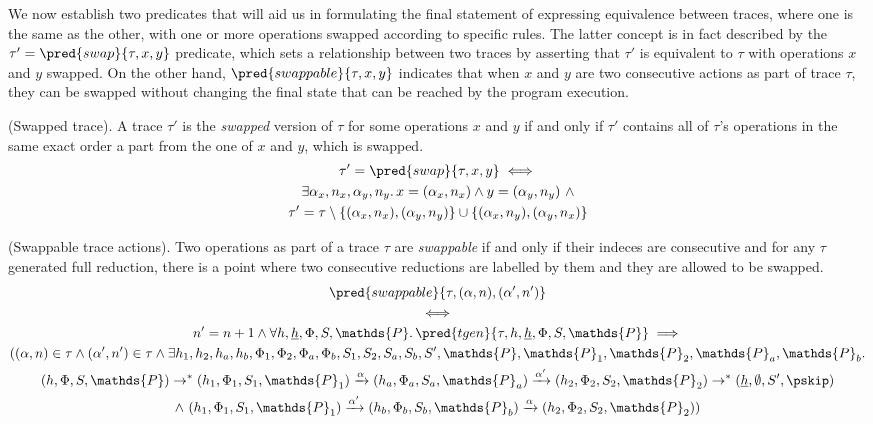 We now establish two predicates that will aid us in formulating the final statement of expressing equivalence between traces, where one is the same as the other, with one or more operations swapped according to specific rules. The latter concept is in fact described by the $\tau' = \pred{swap}{\tau, x, y}$ predicate, which sets a relationship between two traces by asserting that $\tau'$ is equivalent to $\tau$ with operations $x$ and $y$ swapped. On the other hand, $\pred{swappable}{\tau, x, y}$ indicates that when $x$ and $y$ are two consecutive actions as part of trace $\tau$, they can be swapped without changing the final state that can be reached by the program execution.
\begin{defn}
	(Swapped trace).
	A trace $\tau'$ is the \emph{swapped} version of $\tau$ for some operations $x$ and $y$ if and only if $\tau'$ contains all of $\tau$'s operations in the same exact order a part from the one of $x$ and $y$, which is swapped.
	\begin{gather*}
		\tau' = \pred{swap}{\tau, x, y}
		\iff \\
		\exists \alpha_x, n_x, \alpha_y, n_y \ldotp x = (\alpha_x, n_x) \land y = (\alpha_y, n_y)\ \land \\
		\tau' = \tau \setminus \{(\alpha_x, n_x), (\alpha_y, n_y)\} \cup \{ (\alpha_x, n_y), (\alpha_y, n_x) \}
	\end{gather*}
\end{defn}

\begin{defn}
	\label{defn:swappable}
	(Swappable trace actions).
	Two operations as part of a trace  $\tau$ are \emph{swappable} if and only if their indeces are consecutive and for any $\tau$ generated full reduction, there is a point where two consecutive reductions are labelled by them and they are allowed to be swapped.
	\begin{gather*}
		\pred{swappable}{\tau, (\alpha, n), (\alpha', n')} \\
			\iff \\
		n' = n + 1 \land 
		\forall h, \underline{h}, \Phi, S, \mathds{P} \ldotp
		\pred{tgen}{\tau, h, \underline{h}, \Phi, S, \mathds{P}}
			\implies \\
		((\alpha, n) \in \tau
			\land
		(\alpha', n') \in \tau
			\land
		\exists h_1, h_2, h_a, h_b, \Phi_1, \Phi_2, \Phi_a, \Phi_b, S_1, S_2, S_a, S_b, S', \mathds{P}, \mathds{P}_1, \mathds{P}_2, \mathds{P}_a, \mathds{P}_b \ldotp \\
		(h, \Phi, S, \mathds{P})
			\rightarrow^*
		(h_1, \Phi_1, S_1, \mathds{P}_1)
			\xrightarrow{\alpha}
		(h_a, \Phi_a, S_a, \mathds{P}_a)
			\xrightarrow{\alpha'}
		(h_2, \Phi_2, S_2, \mathds{P}_2)
			\rightarrow^*
		(\underline{h}, \emptyset, S', \pskip) \\
			\land\
		(h_1, \Phi_1, S_1, \mathds{P}_1)
			\xrightarrow{\alpha'}
		(h_b, \Phi_b, S_b, \mathds{P}_b)
			\xrightarrow{\alpha}
		(h_2, \Phi_2, S_2, \mathds{P}_2))
	\end{gather*}
\end{defn}


